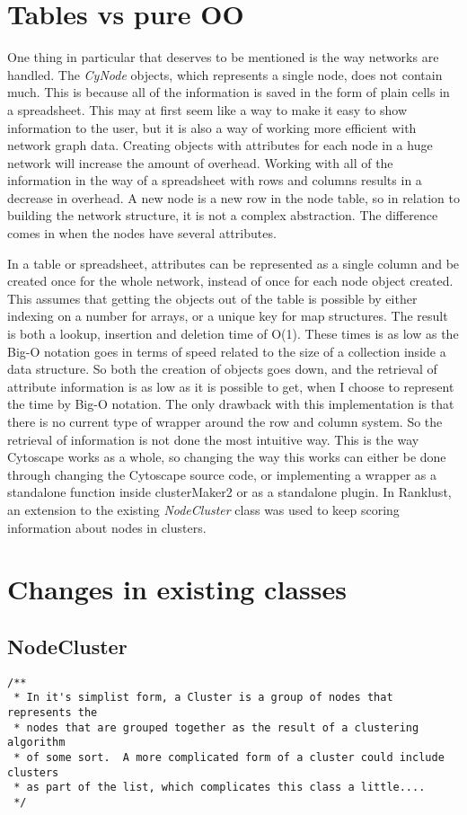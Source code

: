 \section{Tables vs pure OO}
One thing in particular that deserves to be mentioned is the way networks are
handled. The \textit{CyNode} objects, which represents a single node, does not
contain much. This is because all of the information is saved in the form of
plain cells in a spreadsheet. This may at first seem like a way to make it easy
to show information to the user, but it is also a way of working more efficient
with network graph data. Creating objects with attributes for each node in a
huge network will increase the amount of overhead. Working with all of the
information in the way of a spreadsheet with rows and columns results in a
decrease in overhead. A new node is a new row in the node table, so in relation
to building the network structure, it is not a complex abstraction.  The
difference comes in when the nodes have several attributes. 

In a table or spreadsheet, attributes can be represented as a single column and
be created once for the whole network, instead of once for each node object
created. This assumes that getting the objects out of the table is possible by
either indexing on a number for arrays, or a unique key for map structures.
The result is both a lookup, insertion and deletion time of O(1). These times is
as low as the Big-O notation goes in terms of speed related to the size of
a collection inside a data structure. So both the creation of objects goes
down, and the retrieval of attribute information is as low as it is possible to
get, when I choose to represent the time by Big-O notation. The only drawback
with this implementation is that there is no current type of wrapper around the
row and column system. So the retrieval of information is not done the most
intuitive way. This is the way Cytoscape works as a whole, so changing the
way this works can either be done through changing the Cytoscape source code, or
implementing a wrapper as a standalone function inside clusterMaker2 or as
a standalone plugin. In Ranklust, an extension to the existing
\textit{NodeCluster} class was used to keep scoring information about nodes in
clusters.

\section{Changes in existing classes}
\subsection{NodeCluster}
\begin{Verbatim}[fontsize=\scriptsize]
/**
 * In it's simplist form, a Cluster is a group of nodes that represents the
 * nodes that are grouped together as the result of a clustering algorithm
 * of some sort.  A more complicated form of a cluster could include clusters
 * as part of the list, which complicates this class a little....
 */
\end{Verbatim}

